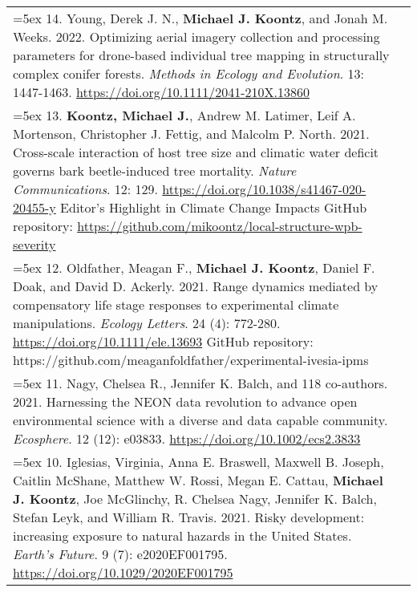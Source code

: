 \begin{longtable}{@{}>{\raggedright}p{6.10in} >{\raggedleft}X @{}}
\hangindent=5ex 14. Young, Derek J. N., \textbf{Michael J. Koontz}, and Jonah M. Weeks. 2022. Optimizing aerial imagery collection and processing parameters for drone-based individual tree mapping in structurally complex conifer forests. \emph{Methods in Ecology and Evolution}. 13: 1447-1463. \href{https://doi.org/10.1111/2041-210X.13860}{https://doi.org/10.1111/2041-210X.13860} & \tabularnewline

\hangindent=5ex 13. \textbf{Koontz, Michael J.}, Andrew M. Latimer, Leif A. Mortenson, Christopher J. Fettig, and Malcolm P. North. 2021. Cross-scale interaction of host tree size and climatic water deficit governs bark beetle-induced tree mortality. \emph{Nature Communications}. 12: 129. \href{https://doi.org/10.1038/s41467-020-20455-y}{https://doi.org/10.1038/s41467-020-20455-y}
\newline *Editor's Highlight in Climate Change Impacts %
\newline GitHub repository: \href{https://github.com/mikoontz/local-structure-wpb-severity}{https://github.com/mikoontz/local-structure-wpb-severity} & \tabularnewline

\hangindent=5ex 12. Oldfather, Meagan F., \textbf{Michael J. Koontz}, Daniel F. Doak, and David D. Ackerly. 2021. Range dynamics mediated by compensatory life stage responses to experimental climate manipulations. \emph{Ecology Letters}. 24 (4): 772-280. \href{https://doi.org/10.1111/ele.13693}{https://doi.org/10.1111/ele.13693}
\newline GitHub repository: https://github.com/meaganfoldfather/experimental-ivesia-ipms & \tabularnewline

\hangindent=5ex 11. Nagy, Chelsea R., Jennifer K. Balch, and 118 co-authors. 2021. Harnessing the NEON data revolution to advance open environmental science with a diverse and data capable community. \emph{Ecosphere}. 12 (12): e03833. \href{https://doi.org/10.1002/ecs2.3833}{https://doi.org/10.1002/ecs2.3833} & \tabularnewline

\hangindent=5ex 10. Iglesias, Virginia, Anna E. Braswell, Maxwell B. Joseph, Caitlin McShane, Matthew W. Rossi, Megan E. Cattau, \textbf{Michael J. Koontz}, Joe McGlinchy, R. Chelsea Nagy, Jennifer K. Balch, Stefan Leyk, and William R. Travis. 2021. Risky development: increasing exposure to natural hazards in the United States. \emph{Earth's Future}. 9 (7): e2020EF001795. \href{https://doi.org/10.1029/2020EF001795}{https://doi.org/10.1029/2020EF001795} & \tabularnewline


\end{longtable}
